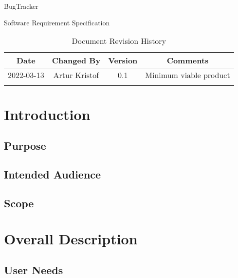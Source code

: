 \documentclass[a4paper]{article}
\begin{document}
    \begin{titlepage}
        \vspace*{\fill}
        \begin{center}
            \huge
            BugTracker

            \vspace{0.4cm}
            \Huge
            Software Requirement Specification

            \vspace{3cm}
            \begin{table}[h]
                \centering
                \caption{Document Revision History}
                \begin{tabular}{cccc}
                    \hline
                    Date & Changed By & Version & Comments \\
                    \hline
                    2022-03-13 & Artur Kristof & 0.1 & Minimum viable product \\
                    \hfill & \hfill & \hfill & \hfill \\
                    \hline
                \end{tabular}
            \end{table}
        \end{center}
        \vspace*{\fill}
    \end{titlepage}

    \tableofcontents

    \section{Introduction}
    \subsection{Purpose}
    \subsection{Intended Audience}
    \subsection{Scope}
    \section{Overall Description}
    \subsection{User Needs}
\end{document}
